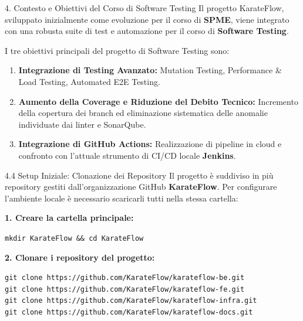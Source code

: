 \documentclass[aspectratio=169, 10pt]{beamer}
\begin{document}
\begin{frame}{4. Contesto e Obiettivi del Corso di Software Testing}
  Il progetto KarateFlow, sviluppato inizialmente come evoluzione per il corso di \textbf{SPME}, viene integrato con una robusta suite di test e automazione per il corso di \textbf{Software Testing}.
  \vspace{0.4cm}
  
  I tre obiettivi principali del progetto di Software Testing sono:
  \vspace{0.2cm}
  \begin{enumerate}
    \item \textbf{Integrazione di Testing Avanzato:} Mutation Testing, Performance & Load Testing, Automated E2E Testing.
    \item \textbf{Aumento della Coverage e Riduzione del Debito Tecnico:} Incremento della copertura dei branch ed eliminazione sistematica delle anomalie individuate dai linter e SonarQube.
    \item \textbf{Integrazione di GitHub Actions:} Realizzazione di pipeline in cloud e confronto con l'attuale strumento di CI/CD locale \textbf{Jenkins}.
  \end{enumerate}
\end{frame}

\begin{frame}{4.4 Setup Iniziale: Clonazione dei Repository}
  Il progetto è suddiviso in più repository gestiti dall'organizzazione GitHub \textbf{KarateFlow}. Per configurare l'ambiente locale è necessario scaricarli tutti nella stessa cartella:
  \vspace{0.3cm}
  
  \textbf{1. Creare la cartella principale:}
  \begin{tcolorbox}[colback=karateLightDark, colframe=karateDark, coltext=karateGray]
    \texttt{mkdir KarateFlow \&\& cd KarateFlow}
  \end{tcolorbox}
  \vspace{0.1cm}
  
  \textbf{2. Clonare i repository del progetto:}
  \begin{tcolorbox}[colback=karateLightDark, colframe=karateDark, coltext=karateGray]
    \texttt{git clone https://github.com/KarateFlow/karateflow-be.git}\\
    \texttt{git clone https://github.com/KarateFlow/karateflow-fe.git}\\
    \texttt{git clone https://github.com/KarateFlow/karateflow-infra.git}\\
    \texttt{git clone https://github.com/KarateFlow/karateflow-docs.git}
  \end{tcolorbox}
\end{frame}
\end{document}
